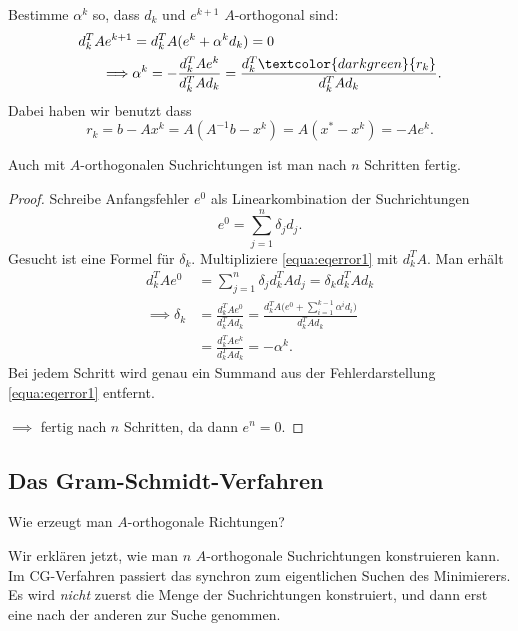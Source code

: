 \medskip

Bestimme $\alpha^k$ so, dass $d_k$ und $e^{k+1}$ $A$-orthogonal sind:
\begin{align*}
 d_k^TAe^{k+1}
 & =
 d_k^TA(e^k+ \alpha^kd_k) = 0 \\
 \implies & \alpha^k=-\frac{d_k^TAe^k}{d_k^TAd_k}=\frac{d_k^T \textcolor{darkgreen}{r_k}}{d_k^TAd_k}.
\end{align*}
Dabei haben wir benutzt dass
\begin{equation*}
 r_k
 =
 b-Ax^k
 =
 A(A^{-1}b - x^k)
 =
 A(x^* - x^k)
 =
 -Ae^k.
\end{equation*}



\begin{lemma}
Auch mit $A$-orthogonalen Suchrichtungen ist man nach $n$ Schritten fertig.
\end{lemma}
\begin{proof}
Schreibe Anfangsfehler $e^0$ als Linearkombination der Suchrichtungen
\begin{equation}
\label{equa:eqerror1}
 e^0=\sum_{j=1}^{n} \delta_jd_j.
\end{equation}
Gesucht ist eine Formel für $\delta_k$. Multipliziere \eqref{equa:eqerror1} mit $d_k^TA$. Man erhält
\begin{align*}
 d_k^TAe^0 & =\sum_{j=1}^n \delta_jd_k^TAd_j=\delta_kd_k^TAd_k \\
 \implies \delta_k & =\frac{d_k^TAe^0}{d_k^TAd_k}
  =
  \frac{d_k^TA \big(e^0+\sum_{i=1}^{k-1} \alpha^id_i \big)}{d_k^TAd_k} \\
 & =
 \frac{d_k^TAe^k}{d_k^TAd_k}=-\alpha^k.
\end{align*}
Bei jedem Schritt wird genau ein Summand aus der Fehlerdarstellung \eqref{equa:eqerror1} entfernt.

$\implies$ fertig nach $n$ Schritten, da dann $e^n=0$.
\end{proof}

\subsection{Das Gram-Schmidt-Verfahren}

Wie erzeugt man $A$-orthogonale Richtungen?

\medskip

Wir erklären jetzt, wie man $n$ $A$-orthogonale Suchrichtungen konstruieren kann.
Im CG-Verfahren passiert das synchron zum eigentlichen Suchen des Minimierers.
Es wird \emph{nicht} zuerst die Menge der Suchrichtungen konstruiert, und dann
erst eine nach der anderen zur Suche genommen.

